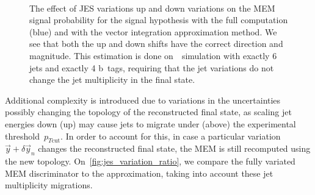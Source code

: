 \begin{figure}[ht]
\begin{centering}
\\
\caption[The distributions of the MEM signal and background probabilities]{The effect of JES variations up and down variations on the MEM signal probability for the signal hypothesis with the full computation (blue) and with the vector integration approximation method. We see that both the up and down shifts have the correct direction and magnitude. This estimation is done on~\ttHbb~simulation with exactly 6 jets and exactly 4 b~tags, requiring that the jet variations do not change the jet multiplicity in the final state.}
\label{fig:jes_variation}
\end{centering}
\end{figure}

Additional complexity is introduced due to variations in the uncertainties possibly changing the topology of the reconstructed final state, as scaling jet energies down (up) may cause jets to migrate under (above) the experimental threshold~$p_{T\mathrm{cut}}$. In order to account for this, in case a particular variation~$\vec{y} + \delta \vec{y}_n$ changes the reconstructed final state, the MEM is still recomputed using the new topology. On~\cref{fig:jes_variation_ratio}, we compare the fully variated MEM discriminator to the approximation, taking into account these jet multiplicity migrations.

